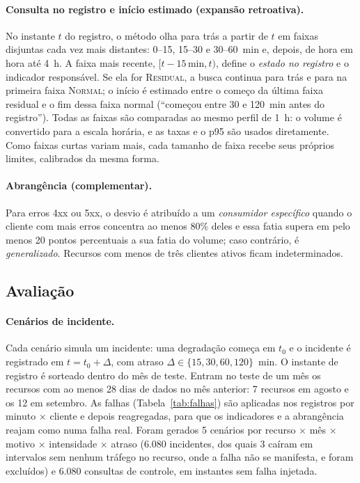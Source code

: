 \documentclass[sigconf,nonacm]{acmart}
\newcommand{\Normal}{\textsc{Normal}\xspace}
\newcommand{\Residual}{\textsc{Residual}\xspace}
\begin{document}
\paragraph{Consulta no registro e início estimado (expansão retroativa).} No instante $t$ do registro, o método olha para trás a partir de $t$ em faixas disjuntas cada vez mais distantes: 0--15, 15--30 e 30--60~min e, depois, de hora em hora até 4~h. A faixa mais recente, $[t-15\,\text{min}, t)$, define o \emph{estado no registro} e o indicador responsável. Se ela for \Residual, a busca continua para trás e para na primeira faixa \Normal; o início é estimado entre o começo da última faixa residual e o fim dessa faixa normal (``começou entre 30 e 120~min antes do registro''). Todas as faixas são comparadas ao mesmo perfil de 1~h: o volume é convertido para a escala horária, e as taxas e o p95 são usados diretamente. Como faixas curtas variam mais, cada tamanho de faixa recebe seus próprios limites, calibrados da mesma forma.

\paragraph{Abrangência (complementar).} Para erros 4xx ou 5xx, o desvio é atribuído a um \emph{consumidor específico} quando o cliente com mais erros concentra ao menos 80\% deles e essa fatia supera em pelo menos 20 pontos percentuais a sua fatia do volume; caso contrário, é \emph{generalizado}. Recursos com menos de três clientes ativos ficam indeterminados.

\subsection{Avaliação}

\paragraph{Cenários de incidente.} Cada cenário simula um incidente: uma degradação começa em $t_0$ e o incidente é registrado em $t=t_0+\Delta$, com atraso $\Delta\in\{15,30,60,120\}$~min. O instante de registro é sorteado dentro do mês de teste. Entram no teste de um mês os recursos com ao menos 28 dias de dados no mês anterior: 7 recursos em agosto e os 12 em setembro. As falhas (Tabela~\ref{tab:falhas}) são aplicadas nos registros por minuto $\times$ cliente e depois reagregadas, para que os indicadores e a abrangência reajam como numa falha real. Foram gerados 5 cenários por recurso $\times$ mês $\times$ motivo $\times$ intensidade $\times$ atraso (6.080 incidentes, dos quais 3 caíram em intervalos sem nenhum tráfego no recurso, onde a falha não se manifesta, e foram excluídos) e 6.080 consultas de controle, em instantes sem falha injetada. 
\end{document}
